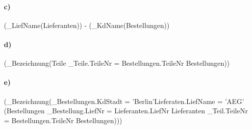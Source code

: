 \documentclass{article}
\begin{document}
\paragraph{c)} (\pi_{LiefName}(Lieferanten)) - (\pi_{KdName}(Bestellungen))

\paragraph{d)}(\pi_{Bezeichnung}(Teile \bowtie_{Teile.TeileNr = Bestellungen.TeileNr} Bestellungen))

\paragraph{e)} (\pi_{Bezeichnung}(\sigma_{Bestellungen.KdStadt = 'Berlin'\wedge Lieferaten.LiefName = 'AEG'}\\(Bestellungen \bowtie_{Bestellung.LiefNr = Lieferanten.LiefNr} Lieferanten \bowtie_{Teil.TeileNr = Bestellungen.TeileNr} Bestellungen)))
\end{document}
